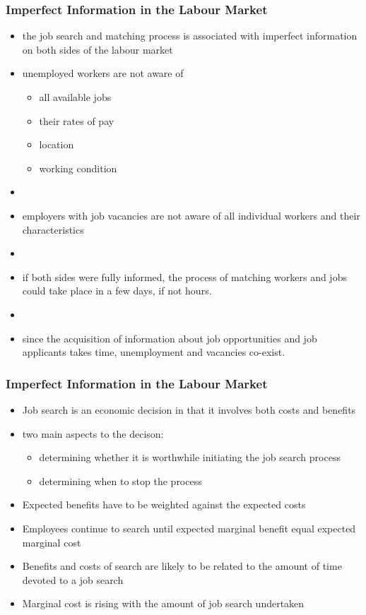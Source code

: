 \documentclass[blue]{beamer}
\begin{document}
   \begin{frame} \frametitle{Imperfect Information in the Labour Market}
\label{imperfect info and labour market}

\begin{itemize}

\item the job search and matching process is associated with imperfect information on both sides of the labour market

\item unemployed workers are not aware of 
\begin{itemize}
\item all available jobs 
\item their rates of pay
\item location
\item working condition
\end{itemize}
\item[]
\item employers with job vacancies are not aware of all individual workers and their characteristics
\item[]
\item if both sides were fully informed, the process of matching workers and jobs could take place in a few days, if not hours. 
\item[]
\item since the acquisition of information about job opportunities and job applicants takes time, unemployment and vacancies co-exist.
 \end{itemize}
 \end{frame}



   \begin{frame} \frametitle{Imperfect Information in the Labour Market}
\label{imperfect info and labour market}

\begin{itemize}

\item Job search is an economic decision in that it involves both costs and benefits
\item two main aspects to the decison:
\begin{itemize}
\item determining whether it is worthwhile initiating the job search process
\item determining when to stop the process
\end{itemize}
\item Expected benefits have to be weighted against the expected costs
\item Employees continue to search until expected marginal benefit equal expected marginal cost
\item Benefits and costs of search are likely to be related to the amount of time devoted to a job search
\item Marginal cost is rising with the amount of job search undertaken

 \end{itemize}
 \end{frame}
\end{document}
